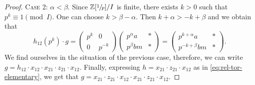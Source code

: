 \documentclass[11pt]{amsart}
\theoremstyle{plain}
\numberwithin{equation}{section}
\numberwithin{lemma}{section}
\theoremstyle{definition}
\theoremstyle{remark}
\begin{document}
\begin{proof}
\textsc{Case 2:} $\alpha<\beta$. 
Since $\mathbb{Z}[\sfrac{1}{p}]/I$ is finite, there exists $k>0$ such that $p^k\equiv 1\pmod I$.
One can choose $k>\beta-\alpha$.
Then $k+\alpha>-k+\beta$ and we obtain that
\[ h_{12} (p^k)\cdot g =
\begin{pmatrix} p^k & 0 \\ 0 & p^{-k} \end{pmatrix}
\begin{pmatrix} p^\alpha a & * \\ p^\beta bm & * \end{pmatrix}=
\begin{pmatrix} p^{k+\alpha} a & * \\ p^{-k+\beta} bm & * \end{pmatrix}. \]
We find ourselves in the situation of the previous case, therefore, we can write $g=h_{12}\cdot x_{12} \cdot x_{21} \cdot z_{21} \cdot x_{12}$.
Finally, expressing $h=x_{21}\cdot z_{21}\cdot x_{12}$ as in \eqref{eq:rel-tor-elementary}, we get that $g=x_{21} \cdot z_{21} \cdot x_{12} \cdot x_{21} \cdot z_{21} \cdot x_{12}$.
\end{proof}
\end{document}
